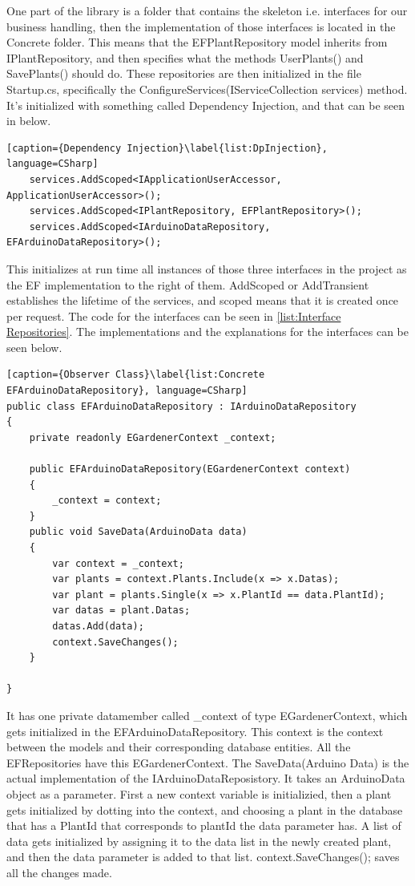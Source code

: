 \documentclass[a4paper,12pt,twoside,openright,titlepage]{book}
\begin{document}
One part of the library is a folder that contains the skeleton i.e. interfaces for our business handling, then the implementation of those interfaces is located in the Concrete folder. This means that the EFPlantRepository model inherits from IPlantRepository, and then specifies what the methods UserPlants() and SavePlants() should do. These repositories are then initialized in the file Startup.cs, specifically the ConfigureServices(IServiceCollection services) method. It's initialized with something called Dependency Injection\href{https://docs.microsoft.com/en-us/aspnet/core/fundamentals/dependency-injection?view=aspnetcore-2.2}, and that can be seen in below.

\begin{lstlisting}[caption={Dependency Injection}\label{list:DpInjection}, language=CSharp]
	services.AddScoped<IApplicationUserAccessor, ApplicationUserAccessor>();
	services.AddScoped<IPlantRepository, EFPlantRepository>();
    services.AddScoped<IArduinoDataRepository, EFArduinoDataRepository>();
\end{lstlisting}

This initializes at run time all instances of those three interfaces in the project as the EF implementation to the right of them. AddScoped or AddTransient establishes the lifetime of the services, and scoped means that it is created once per request. The code for the interfaces can be seen in \ref{list:Interface Repositories}. The implementations and the explanations for the interfaces can be seen below.

\begin{lstlisting}[caption={Observer Class}\label{list:Concrete EFArduinoDataRepository}, language=CSharp]
public class EFArduinoDataRepository : IArduinoDataRepository
{
	private readonly EGardenerContext _context;
        
	public EFArduinoDataRepository(EGardenerContext context)
	{
        _context = context;
	}
	public void SaveData(ArduinoData data)
	{
		var context = _context;
		var plants = context.Plants.Include(x => x.Datas);
	    var plant = plants.Single(x => x.PlantId == data.PlantId);
        var datas = plant.Datas;
        datas.Add(data);
		context.SaveChanges();
	}

}
\end{lstlisting}

It has one private datamember called \_context of type EGardenerContext, which gets initialized in the EFArduinoDataRepository. This context is the context between the models and their corresponding database entities. All the EFRepositories have this EGardenerContext. The SaveData(Arduino Data) is the actual implementation of the IArduinoDataReposistory. It takes an ArduinoData object as a parameter. First a new context variable is initializied, then a plant gets initialized by dotting into the context, and choosing a plant in the database that has a PlantId that corresponds to plantId the data parameter has. A list of data gets initialized by assigning it to the data list in the newly created plant, and then the data parameter is added to that list. context.SaveChanges(); saves all the changes made.  
\end{document}
